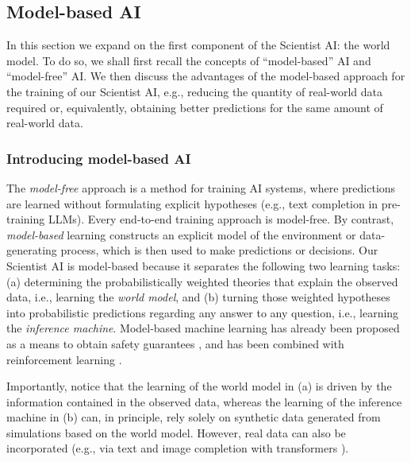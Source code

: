\subsection{Model-based AI}
\label{sec:plan:modelbased}

In this section we expand on the first component of the Scientist AI: the world model. To do so, we shall first recall the concepts of ``model-based'' AI and ``model-free'' AI. We then discuss the advantages of the model-based approach for the training of our Scientist AI, e.g., reducing the quantity of real-world data required or, equivalently, obtaining better predictions for the same amount of real-world data.

\subsubsection{Introducing model-based AI}
\label{sec:plan:modelbased:intro}
    
The \emph{model-free} approach is a method for training AI systems, where predictions are learned without formulating explicit hypotheses (e.g., text completion in pre-training LLMs). Every end-to-end training approach is model-free. By contrast, \emph{model-based} learning constructs an explicit model of the environment or data-generating process, which is then used to make predictions or decisions. Our Scientist AI is model-based because it separates the following two learning tasks: (a) determining the probabilistically weighted theories that explain the observed data, i.e., learning the \emph{world model}, and (b) turning those weighted hypotheses into probabilistic predictions regarding any answer to any question, i.e., learning the \emph{inference machine}. Model-based machine learning has already been proposed as a means to obtain safety guarantees \cite{arxiv.org.abs.2405.06624}, and has been combined with reinforcement learning \cite{mitpress.mit.edu.9780262039246.reinforcement.learning,link.springer.com.article.10.1007.s11432.022.3696.5}.

Importantly, notice that the learning of the world model in (a) is driven by the information contained in the observed data, whereas the learning of the inference machine in (b) can, in principle, rely solely on synthetic data generated from simulations based on the world model. However, real data can also be incorporated (e.g., via text and image completion with transformers \cite{aclanthology.org.N19.1423,openaccess.thecvf.com.content.CVPR2022.html.He.Masked.Autoencoders.Are.Scalable.Vision.Learners.CVPR.2022.paper}).

